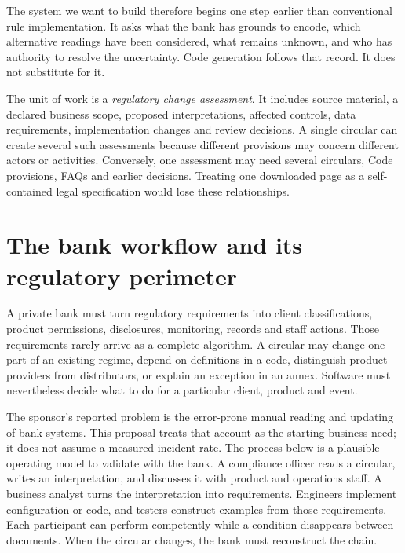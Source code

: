 The system we want to build therefore begins one step earlier than conventional
rule implementation. It asks what the bank has grounds to encode, which
alternative readings have been considered, what remains unknown, and who has
authority to resolve the uncertainty. Code generation follows that record. It
does not substitute for it.

The unit of work is a \emph{regulatory change assessment}. It includes source
material, a declared business scope, proposed interpretations, affected controls,
data requirements, implementation changes and review decisions. A single
circular can create several such assessments because different provisions may
concern different actors or activities. Conversely, one assessment may need
several circulars, Code provisions, FAQs and earlier decisions. Treating one
downloaded page as a self-contained legal specification would lose these
relationships.

\section{The bank workflow and its regulatory perimeter}
\label{merge:P-01-problem:00}

\label{sec:problem}

A private bank must turn regulatory requirements into client classifications,
product permissions, disclosures, monitoring, records and staff actions. Those
requirements rarely arrive as a complete algorithm. A circular may change one
part of an existing regime, depend on definitions in a code, distinguish product
providers from distributors, or explain an exception in an annex. Software must
nevertheless decide what to do for a particular client, product and event.

The sponsor's reported problem is the error-prone manual reading and updating of
bank systems. This proposal treats that account as the starting business need;
it does not assume a measured incident rate. The process below is a plausible
operating model to validate with the bank. A compliance officer reads a circular,
writes an interpretation, and discusses it with product and operations staff. A
business analyst turns the interpretation into requirements. Engineers implement
configuration or code, and testers construct examples from those requirements.
Each participant can perform competently while a condition disappears between
documents. When the circular changes, the bank must reconstruct the chain.

